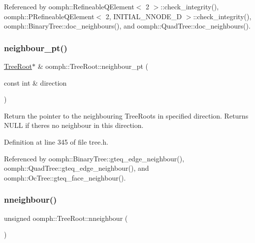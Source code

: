 Referenced by oomph\+::\+Refineable\+Q\+Element$<$ 2 $>$\+::check\+\_\+integrity(), oomph\+::\+P\+Refineable\+Q\+Element$<$ 2, I\+N\+I\+T\+I\+A\+L\+\_\+\+N\+N\+O\+D\+E\+\_\+D $>$\+::check\+\_\+integrity(), oomph\+::\+Binary\+Tree\+::doc\+\_\+neighbours(), and oomph\+::\+Quad\+Tree\+::doc\+\_\+neighbours().

\mbox{\label{classoomph_1_1TreeRoot_a1b03a77d1231ef49f236a97374c15d6b}} 
\subsubsection{\texorpdfstring{neighbour\+\_\+pt()}{neighbour\_pt()}}
{\footnotesize\ttfamily \hyperlink{classoomph_1_1TreeRoot}{Tree\+Root}$\ast$ \& oomph\+::\+Tree\+Root\+::neighbour\+\_\+pt (\begin{DoxyParamCaption}\item[{const int \&}]{direction }\end{DoxyParamCaption})\hspace{0.3cm}{\ttfamily [inline]}}



Return the pointer to the neighbouring Tree\+Roots in specified direction. Returns N\+U\+LL if there\textquotesingle{}s no neighbour in this direction. 



Definition at line 345 of file tree.\+h.



Referenced by oomph\+::\+Binary\+Tree\+::gteq\+\_\+edge\+\_\+neighbour(), oomph\+::\+Quad\+Tree\+::gteq\+\_\+edge\+\_\+neighbour(), and oomph\+::\+Oc\+Tree\+::gteq\+\_\+face\+\_\+neighbour().

\mbox{\label{classoomph_1_1TreeRoot_a81be1a835829a48f7f443dcc85f369b9}} 
\subsubsection{\texorpdfstring{nneighbour()}{nneighbour()}}
{\footnotesize\ttfamily unsigned oomph\+::\+Tree\+Root\+::nneighbour (\begin{DoxyParamCaption}{ }\end{DoxyParamCaption})\hspace{0.3cm}{\ttfamily [inline]}}



